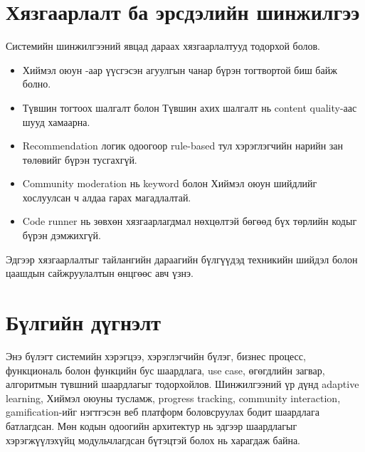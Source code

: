 \section{Хязгаарлалт ба эрсдэлийн шинжилгээ}
Системийн шинжилгээний явцад дараах хязгаарлалтууд тодорхой болов.
\begin{itemize}
\item Хиймэл оюун -аар үүсгэсэн агуулгын чанар бүрэн тогтвортой биш байж болно.
\item Түвшин тогтоох шалгалт болон Түвшин ахих шалгалт нь content quality-аас шууд хамаарна.
\item Recommendation логик одоогоор rule-based тул хэрэглэгчийн нарийн зан төлөвийг бүрэн тусгахгүй.
\item Community moderation нь keyword болон Хиймэл оюун  шийдлийг хослуулсан ч алдаа гарах магадлалтай.
\item Code runner нь зөвхөн хязгаарлагдмал нөхцөлтэй бөгөөд бүх төрлийн кодыг бүрэн дэмжихгүй.
\end{itemize}

Эдгээр хязгаарлалтыг тайлангийн дараагийн бүлгүүдэд техникийн шийдэл болон цаашдын сайжруулалтын өнцгөөс авч үзнэ.

\section{Бүлгийн дүгнэлт}
Энэ бүлэгт системийн хэрэгцээ, хэрэглэгчийн бүлэг, бизнес процесс, функциональ болон функцийн бус шаардлага, use case, өгөгдлийн загвар, алгоритмын түвшний шаардлагыг тодорхойлов. Шинжилгээний үр дүнд adaptive learning, Хиймэл оюуны тусламж, progress tracking, community interaction, gamification-ийг нэгтгэсэн веб платформ боловсруулах бодит шаардлага батлагдсан. Мөн кодын одоогийн архитектур нь эдгээр шаардлагыг хэрэгжүүлэхүйц модульчлагдсан бүтэцтэй болох нь харагдаж байна.
